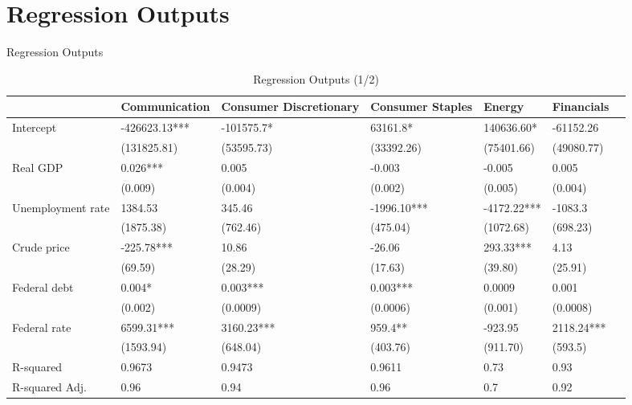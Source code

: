 \documentclass[11pt]{beamer}
\begin{document}
\section{Regression Outputs}
\begin{frame}{Regression Outputs}

\begin{table}
\caption{Regression Outputs (1/2)}
\label{table:1}
\begin{center}
\tiny
\begin{tabular}{lllllll} \hline                  & Communication & Consumer Discretionary & Consumer Staples & Energy  & Financials  \\  \hline 
Intercept          & -426623.13***     & -101575.7*      & 63161.8*        & 140636.60*  & -61152.26    \\                    & (131825.81)       & (53595.73)       & (33392.26)       & (75401.66)  & (49080.77)     \\  
Real GDP          & 0.026***           & 0.005             & -0.003            & -0.005       & 0.005          \\                   & (0.009)            & (0.004)           & (0.002)           & (0.005)      & (0.004)           \\  
Unemployment rate & 1384.53           & 345.46           & -1996.10***      & -4172.22*** & -1083.3        \\                    & (1875.38)         & (762.46)         & (475.04)         & (1072.68)   & (698.23)        \\  
Crude price       & -225.78***        & 10.86           & -26.06           & 293.33***   & 4.13   \\                    & (69.59)           & (28.29)          & (17.63)          & (39.80)     & (25.91)    \\ 
Federal debt      & 0.004*             & 0.003***          & 0.003***          & 0.0009        & 0.001        \\                   & (0.002)            & (0.0009)           & (0.0006)           & (0.001)      & (0.0008)        \\ 
Federal rate      & 6599.31***        & 3160.23***       & 959.4**         & -923.95     & 2118.24***    \\                    & (1593.94)         & (648.04)         & (403.76)         & (911.70)    & (593.5)     \\ \hline  
R-squared          & 0.9673              & 0.9473             & 0.9611             & 0.73        & 0.93         \\  
R-squared Adj.     & 0.96              & 0.94             & 0.96             & 0.7        & 0.92         \\ \hline
\end{tabular}
\end{center}
\end{table}
\end{frame}
\end{document}
